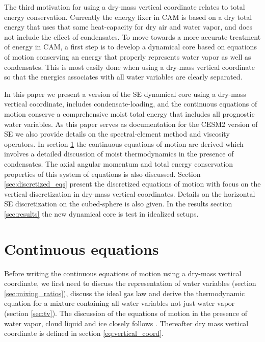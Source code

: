 \documentclass{agujournal}
\begin{document}
The third motivation for using a dry-mass vertical coordinate relates to total energy conservation. Currently the energy fixer in CAM is based on a dry total energy \citep{WOHTTV2015JAMES} that uses that same heat-capacity for dry air and water vapor, and does not include the effect of condensates. To move towards a more accurate treatment of energy in CAM, a first step is to develop a dynamical core based on equations of motion conserving an energy that properly represents water vapor as well as condensates. This is most easily done when using a dry-mass vertical coordinate so that the energies associates with all water variables are clearly separated.

In this paper we present a version of the SE dynamical core using a dry-mass vertical coordinate, includes condensate-loading, and the continuous equations of motion conserve a comprehensive moist total energy that includes all prognostic water variables. As this paper serves as documentation for the CESM2 version of SE we also provide details on the spectral-element method and viscosity operators. In section \ref{sec:cont-eq} the continuous equations of motion are derived which involves a detailed discussion of moist thermodynamics in the presence of condensates. The axial angular momentum and total energy conservation properties of this system of equations is also discussed. Section \ref{sec:discretized_eqs} present the discretized equations of motion with focus on the vertical discretization in dry-mass vertical coordinates. Details on the horizontal SE discretization on the cubed-sphere is also given. In the results section \ref{sec:results} the new dynamical core is test in idealized setups. {\color{red}{bla bla}}

\section{Continuous equations}\label{sec:cont-eq}
Before writing the continuous equations of motion using a dry-mass vertical coordinate, we first need to discuss the representation of water variables (section \ref{sec:mixing_ratios}), discuss the ideal gas law and derive the thermodynamic equation for a mixture containing all water variables not just water vapor (section \ref{sec:tv}). The discussion of the equations of motion in the presence of water vapor, cloud liquid and ice closely follows \citet{joyOfUM}. Thereafter dry mass vertical coordinate is defined in section \ref{eq:vertical_coord}. {\color{red}{more details on other sections}}
\end{document}
